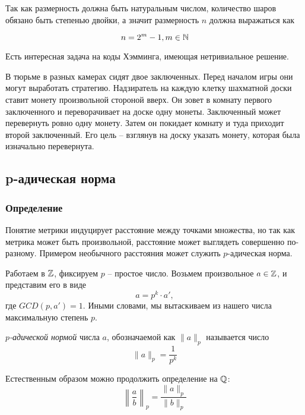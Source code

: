 \documentclass[../functional-analysis_17-18.tex]{subfiles}
\begin{document}
	Так как размерность должна быть натуральным числом, количество шаров обязано быть степенью двойки, а значит размерность $n$ должна выражаться как
	
	\[
		n = 2^m - 1, m \in \mathbb{N}
	\]
	
	
	
	
	Есть интересная задача на коды Хэмминга, имеющая нетривиальное решение.
	\begin{task}
		В тюрьме в разных камерах сидят двое заключенных. Перед началом игры они могут выработать стратегию. Надзиратель на каждую клетку шахматной доски ставит монету произвольной стороной вверх. Он зовет в комнату первого заключенного и переворачивает на доске одну монеты. Заключенный может перевернуть ровно одну монету. Затем он покидает комнату и туда приходит второй заключенный. Его цель -- взглянув на доску указать монету, которая была изначально перевернута.
	\end{task}
	
	\subsection{p-адическая норма}
	\subsubsection{Определение}
	Понятие метрики индуцирует расстояние между точками множества, но так как метрика может быть произвольной, расстояние может выглядеть совершенно по-разному. Примером необычного расстояния может служить $p$-адическая норма.
	
	Работаем в $\mathbb{Z}$, фиксируем $p$ -- простое число. Возьмем произвольное $a \in \mathbb{Z}$, и представим его в виде
	\begin{equation}
		a = p^k \cdot a',
	\end{equation}
	где $GCD(p, a') = 1$. Иными словами, мы вытаскиваем из нашего числа максимальную степень $p$. 
	
	\begin{definition}
		\textit{$p$-адической нормой} числа $a$, обозначаемой как $\|a\|_p$ называется число
		\begin{equation}
			\|a\|_p = \frac{1}{p^k}
		\end{equation}		
	\end{definition}
	
	Естественным образом можно продолжить определение на $\mathbb{Q}$:
	\begin{equation}
		\left\|\frac{a}{b}\right\|_p = \frac{\|a\|_p}{\|b\|_p}
	\end{equation}
	
\end{document}
